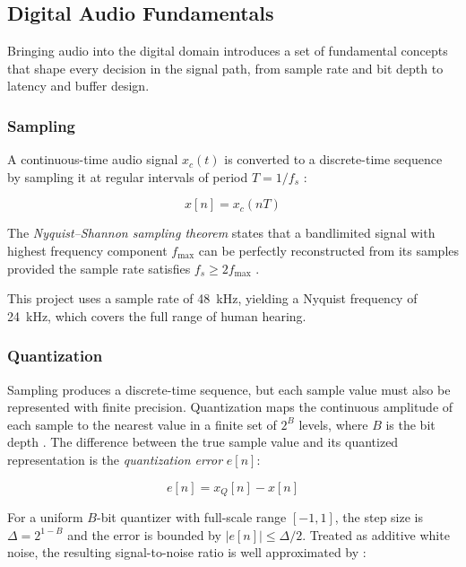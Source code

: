 \subsection{Digital Audio Fundamentals}
\label{sec:digital-audio-fundamentals}

Bringing audio into the digital domain introduces a set of fundamental concepts that shape every decision in the signal path, from sample rate and bit depth to latency and buffer design.

\subsubsection{Sampling}

A continuous-time audio signal $x_c(t)$ is converted to a discrete-time sequence by sampling it at regular intervals of period $T = 1/f_s$ \cite[p.~160]{oppenheimDiscretetimeSignalProcessing2014}:

\begin{equation}
x[n] = x_c(nT)
\end{equation}

The \textit{Nyquist--Shannon sampling theorem} states that a bandlimited signal with highest frequency component $f_{\max}$ can be perfectly reconstructed from its samples provided the sample rate satisfies $f_s \geq 2 f_{\max}$ \cite[p.~166]{oppenheimDiscretetimeSignalProcessing2014}\cite[p.~40]{zolzerDAFXDigitalAudio211}.

This project uses a sample rate of \qty{48}{kHz}, yielding a Nyquist frequency of \qty{24}{kHz}, which covers the full range of human hearing.

\subsubsection{Quantization}

Sampling produces a discrete-time sequence, but each sample value must also be represented with finite precision.
Quantization maps the continuous amplitude of each sample to the nearest value in a finite set of $2^B$ levels, where $B$ is the bit depth \cite[p.~218]{oppenheimDiscretetimeSignalProcessing2014}.
The difference between the true sample value and its quantized representation is the \textit{quantization error} $e[n]$:

\begin{equation}
e[n] = x_Q[n] - x[n]
\end{equation}

For a uniform $B$-bit quantizer with full-scale range $[-1, 1]$, the step size is $\Delta = 2^{1-B}$ and the error is bounded by $|e[n]| \leq \Delta/2$.
Treated as additive white noise, the resulting signal-to-noise ratio is well approximated by \cite[p.~226]{oppenheimDiscretetimeSignalProcessing2014}:

